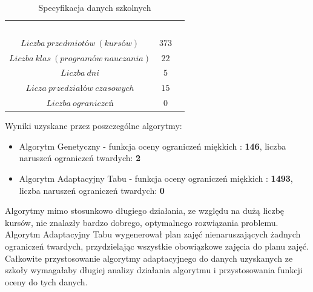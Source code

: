 \begin{table}[H]
\begin{center}
\begin{tabular}{ |c|c|c| }
\multicolumn{1}{r}{}
 &  \multicolumn{1}{c}{$$}
 & \multicolumn{1}{c}{$$} 
 \\
\cline{1-2}
$Liczba\ przedmiotów\ (kursów)$ & $373$\\
\cline{1-2}
$Liczba\ klas\ (programów\ nauczania)$ & $22$\\
\cline{1-2}
$Liczba\ dni$ & $5$ \\
\cline{1-2}
$Licza\ przedziałów\ czasowych$ & $15$ \\
\cline{1-2}
$Liczba\ ograniczeń$ & $0$ \\
\cline{1-2}
\end{tabular}
\end{center}
\caption {Specyfikacja danych szkolnych}
\end{table}
Wyniki uzyskane przez poszczególne algorytmy:
\begin{itemize}
\item Algorytm Genetyczny - funkcja oceny ograniczeń miękkich : \textbf{146}, liczba naruszeń ograniczeń twardych: \textbf{2}
\item Algorytm Adaptacyjny Tabu - funkcja oceny ograniczeń miękkich : \textbf{1493}, liczba naruszeń ograniczeń twardych: \textbf{0}
\end{itemize}
Algorytmy mimo stosunkowo długiego działania, ze względu na dużą liczbę kursów, nie znalazły bardzo dobrego, optymalnego rozwiązania problemu. Algorytm Adaptacyjny Tabu wygenerował plan zajęć nienaruszających żadnych ograniczeń twardych, przydzielając wszystkie obowiązkowe zajęcia do planu zajęć. Całkowite przystosowanie algorytmy adaptacyjnego do danych uzyskanych ze szkoły wymagałaby długiej analizy działania algorytmu i przystosowania funkcji oceny do tych danych.


